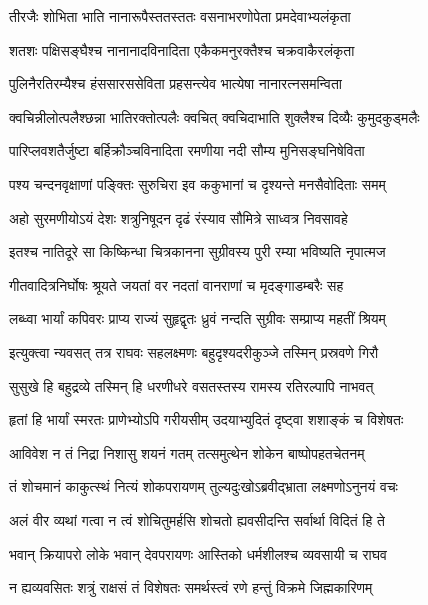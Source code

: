 \twolineshloka
{तीरजैः शोभिता भाति नानारूपैस्ततस्ततः}
{वसनाभरणोपेता प्रमदेवाभ्यलंकृता} %

\twolineshloka
{शतशः पक्षिसङ्घैश्च नानानादविनादिता}
{एकैकमनुरक्तैश्च चक्रवाकैरलंकृता} %

\twolineshloka
{पुलिनैरतिरम्यैश्च हंससारससेविता}
{प्रहसन्त्येव भात्येषा नानारत्नसमन्विता} %

\twolineshloka
{क्वचिन्नीलोत्पलैश्छन्ना भातिरक्तोत्पलैः क्वचित्}
{क्वचिदाभाति शुक्लैश्च दिव्यैः कुमुदकुड्मलैः} %

\twolineshloka
{पारिप्लवशतैर्जुष्टा बर्हिक्रौञ्चविनादिता}
{रमणीया नदी सौम्य मुनिसङ्घनिषेविता} %

\twolineshloka
{पश्य चन्दनवृक्षाणां पङ्क्तिः सुरुचिरा इव}
{ककुभानां च दृश्यन्ते मनसैवोदिताः समम्} %

\twolineshloka
{अहो सुरमणीयोऽयं देशः शत्रुनिषूदन}
{दृढं रंस्याव सौमित्रे साध्वत्र निवसावहे} %

\twolineshloka
{इतश्च नातिदूरे सा किष्किन्धा चित्रकानना}
{सुग्रीवस्य पुरी रम्या भविष्यति नृपात्मज} %

\twolineshloka
{गीतवादित्रनिर्घोषः श्रूयते जयतां वर}
{नदतां वानराणां च मृदङ्गाडम्बरैः सह} %

\twolineshloka
{लब्ध्वा भार्यां कपिवरः प्राप्य राज्यं सुहृद्वृतः}
{ध्रुवं नन्दति सुग्रीवः सम्प्राप्य महतीं श्रियम्} %

\twolineshloka
{इत्युक्त्वा न्यवसत् तत्र राघवः सहलक्ष्मणः}
{बहुदृश्यदरीकुञ्जे तस्मिन् प्रस्रवणे गिरौ} %

\twolineshloka
{सुसुखे हि बहुद्रव्ये तस्मिन् हि धरणीधरे}
{वसतस्तस्य रामस्य रतिरल्पापि नाभवत्} %

\twolineshloka
{हृतां हि भार्यां स्मरतः प्राणेभ्योऽपि गरीयसीम्}
{उदयाभ्युदितं दृष्ट्वा शशाङ्कं च विशेषतः} %

\twolineshloka
{आविवेश न तं निद्रा निशासु शयनं गतम्}
{तत्समुत्थेन शोकेन बाष्पोपहतचेतनम्} %

\twolineshloka
{तं शोचमानं काकुत्स्थं नित्यं शोकपरायणम्}
{तुल्यदुःखोऽब्रवीद्भ्राता लक्ष्मणोऽनुनयं वचः} %

\twolineshloka
{अलं वीर व्यथां गत्वा न त्वं शोचितुमर्हसि}
{शोचतो ह्यवसीदन्ति सर्वार्था विदितं हि ते} %

\twolineshloka
{भवान् क्रियापरो लोके भवान् देवपरायणः}
{आस्तिको धर्मशीलश्च व्यवसायी च राघव} %

\twolineshloka
{न ह्यव्यवसितः शत्रुं राक्षसं तं विशेषतः}
{समर्थस्त्वं रणे हन्तुं विक्रमे जिह्मकारिणम्} %

